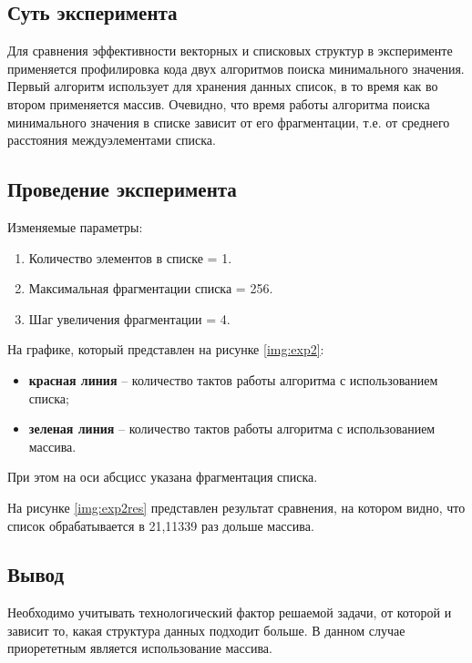 \subsection{Суть эксперимента}  
Для сравнения эффективности векторных и списковых структур в эксперименте
применяется профилировка кода двух алгоритмов поиска минимального значения.
Первый алгоритм использует для хранения данных список, в то время как во втором
применяется массив. Очевидно, что время работы алгоритма поиска минимального
значения в списке зависит от его фрагментации, т.е. от среднего расстояния
междуэлементами   списка. 

\subsection{Проведение эксперимента}

Изменяемые параметры:
\begin{enumerate}
	\item Количество элементов в списке = 1.
	\item Максимальная фрагментации списка = 256.
	\item Шаг увеличения фрагментации = 4.
\end{enumerate}

На графике, который представлен на рисунке \ref{img:exp2}:
\begin{itemize}
    \item \textbf{красная линия} -- количество тактов работы алгоритма с
          использованием списка;
    \item \textbf{зеленая линия} -- количество тактов работы алгоритма с
          использованием массива.
\end{itemize}

При этом на оси абсцисс указана фрагментация списка.



На рисунке \ref{img:exp2res} представлен результат сравнения, на
котором видно, что список обрабатывается в 21,11339 раз дольше массива.

\subsection{Вывод}

Необходимо учитывать технологический фактор решаемой задачи, от которой и
зависит то, какая структура данных подходит больше. В данном случае
приорететным является использование массива. 

